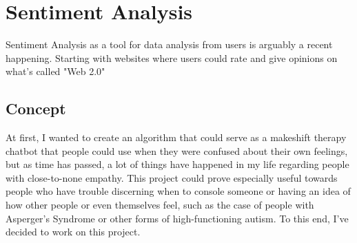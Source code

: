 \chapter{Sentiment Analysis}
Sentiment Analysis as a tool for data analysis from users is arguably a recent happening. Starting with websites where users could rate and give opinions on what's called "Web 2.0"
 \citep{rf3}

\section{Concept}
At first, I wanted to create an algorithm that could serve as a makeshift therapy chatbot that people could use when they were confused about their own feelings, but as time has passed, a lot of things have happened in my life regarding people with close-to-none empathy.
This project could prove especially useful towards people who have trouble discerning when to console someone or having an idea of how other people or even themselves feel, such as the case of people with Asperger's Syndrome or other forms of high-functioning autism.
To this end, I've decided to work on this project.
\clearpage